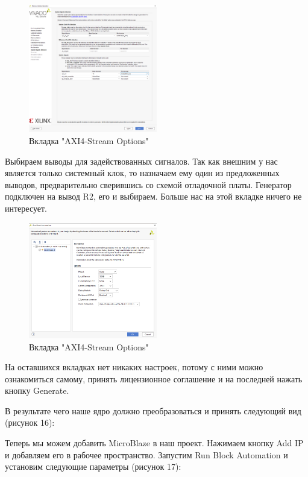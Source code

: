 \documentclass[a4paper,oneside ,14pt]{extreport}
\begin{document}
\begin{figure}[h]
	\centering
	\includegraphics[width=0.5\textwidth]{image/mig_11.png}
	\caption{Вкладка "AXI4-Stream Options"}
	\label{cordic_axi4_stream_options}
\end{figure}

Выбираем выводы для задействованных сигналов. Так как внешним у нас является только системный клок, то назначаем ему один из предложенных выводов, предварительно сверившись со схемой отладочной платы. Генератор подключен на вывод R2, его и выбираем. Больше нас на этой вкладке ничего не интересует.

\begin{figure}[h]
	\centering
	\includegraphics[width=0.5\textwidth]{image/mig_m_0.png}
	\caption{Вкладка "AXI4-Stream Options"}
	\label{mig_m_0}
\end{figure}

На оставшихся вкладках нет никаких настроек, потому с ними можно ознакомиться самому, принять лицензионное соглашение и на последней нажать кнопку Generate.

В результате чего наше ядро должно преобразоваться и принять следующий вид (рисунок 16):

Теперь мы можем добавить MicroBlaze в наш проект. 
Нажимаем кнопку Add IP и добавляем его в рабочее пространство. 
Запустим Run Block Automation и установим следующие параметры (рисунок 17):
\end{document}
